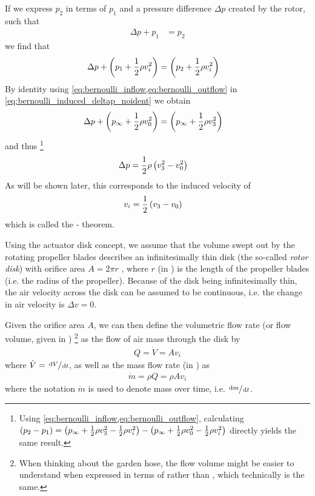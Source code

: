 If we express $p_2$ in terms of $p_1$ and a pressure difference $\Delta p$ created by the rotor, such that
\begin{align}
\Delta p + p_1 &= p_2
\end{align}
%
we find that
%
\begin{align}
\Delta p + \left( p_1 + \frac{1}{2} \rho v^2_i \right) &= \left(  p_2 + \frac{1}{2} \rho v^2_i \right) \label{eq:bernoulli_induced_deltap_noident}
\end{align}
%
By identity using \cref{eq:bernoulli_inflow,eq:bernoulli_outflow} in \cref{eq:bernoulli_induced_deltap_noident} we obtain
%
\begin{align}
\Delta p + \left( p_\infty + \frac{1}{2} \rho v^2_0 \right) &= \left( p_\infty + \frac{1}{2} \rho v^2_3 \right) \label{eq:bernoulli_induced_deltap}
\end{align}
%
and thus%
\footnote{Using \cref{eq:bernoulli_inflow,eq:bernoulli_outflow}, calculating
$\left( p_2 - p_1 \right) = \left(p_\infty + \frac{1}{2} \rho v^2_3 - \frac{1}{2} \rho v^2_i\right) - \left( p_\infty + \frac{1}{2} \rho v^2_0 - \frac{1}{2} \rho v^2_i\right)$ directly yields the same result.
}
%
\begin{align}
\Delta p &= \frac{1}{2} \rho \left( v^2_3 - v^2_0 \right)
\end{align}
%
As will be shown later, this corresponds to the induced velocity of
%
\begin{align}
v_i &= \frac{1}{2} \left( v_3 - v_0 \right) \label{eq:froude_rankine_theorem}
\end{align}
%
which is called the - theorem.

Using the actuator disk concept, we assume that the volume swept out by the rotating propeller blades describes an infinitesimally thin disk (the so-called \textit{rotor disk}) with orifice area $A = 2\pi r$%
, where $r$ (in \withunit{\metre}) is the length of the propeller blades (i.e. the radius of the propeller).
Because of the disk being infinitesimally thin, the air velocity across the disk can be assumed to be continuous, i.e. the change in air velocity is $\Delta v = 0$. 

Given the orifice area $A$, we can then define the volumetric flow rate %
(or flow volume, given in \withunit{\cubic\metre\per\second})%
\footnote{When
thinking about the garden hose, the flow volume might be easier to understand when expressed in terms of  rather than , which technically is the same.}
as the flow of air mass through the disk by
%
\begin{align}
Q = \dot{V} = A v_i \label{eq:flowvolume}
\end{align}
%
where $\dot{V} = \sfrac{\mathop{}\!\mathrm{d} V}{\mathop{}\!\mathrm{d} t}$, as well as the mass flow rate (in \withunit{\kilo\gram\per\second}) as
%
\begin{align}
\dot{m} = \rho Q = \rho A v_i \label{eq:massflow}
\end{align}
%
where the notation $\dot{m}$ is used to denote mass over time, i.e. $\sfrac{\mathop{}\!\mathrm{d} m}{\mathop{}\!\mathrm{d} t}$. %

